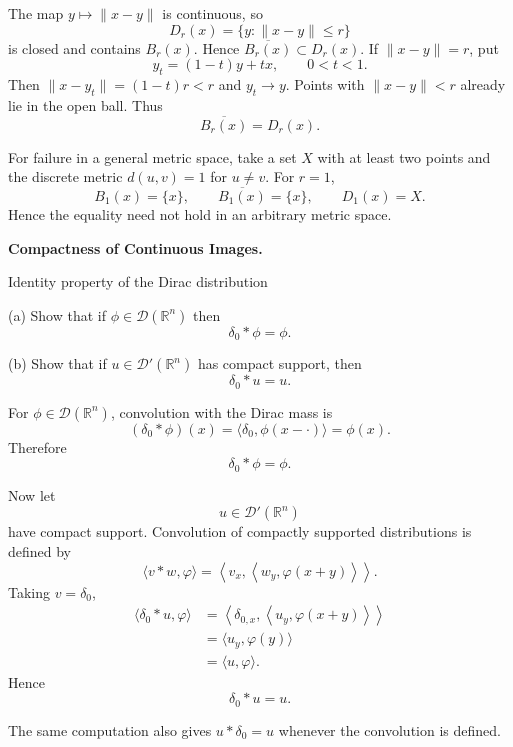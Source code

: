 \begin{solution}
The map \(y\mapsto\|x-y\|\) is continuous, so
\[
D_r(x)=\{y:\|x-y\|\le r\}
\]
is closed and contains \(B_r(x)\). Hence \(\overline{B_r(x)}\subset D_r(x)\).
If \(\|x-y\|=r\), put
\[
y_t=(1-t)y+tx,\qquad0<t<1.
\]
Then \(\|x-y_t\|=(1-t)r<r\) and \(y_t\to y\). Points with
\(\|x-y\|<r\) already lie in the open ball. Thus
\[
\boxed{\overline{B_r(x)}=D_r(x)}.
\]

For failure in a general metric space, take a set \(X\) with at least two points and
the discrete metric \(d(u,v)=1\) for \(u\ne v\). For \(r=1\),
\[
B_1(x)=\{x\},
\qquad
\overline{B_1(x)}=\{x\},
\qquad
D_1(x)=X.
\]
Hence the equality need not hold in an arbitrary metric space.
\end{solution}

\begin{problem}[CP-II-0166]
\label{prob:cp-ii-0166}
\textbf{Compactness of Continuous Images.}

\hspace*{1.5em}Identity property of the Dirac distribution

\noindent
(a)\; Show that if $\phi \in \mathcal{D}(\mathbb{R}^n)$ then
\[
\delta_0 * \phi = \phi .
\]

\medskip
\noindent
(b)\; Show that if $u \in \mathcal{D}'(\mathbb{R}^n)$ has compact support, then
\[
\delta_0 * u = u .
\]
\end{problem}

\begin{solution}
For \(\phi\in\mathcal D(\mathbb R^n)\), convolution with the Dirac mass is
\[
(\delta_0*\phi)(x)
=
\langle\delta_0,\phi(x-\cdot)\rangle
=
\phi(x).
\]
Therefore
\[
\boxed{\delta_0*\phi=\phi.}
\]

Now let
\[
u\in\mathcal D'(\mathbb R^n)
\]
have compact support. Convolution of compactly supported distributions is defined by
\[
\langle v*w,\varphi\rangle
=
\left\langle
v_x,
\left\langle
w_y,\varphi(x+y)
\right\rangle
\right\rangle.
\]
Taking \(v=\delta_0\),
\[
\begin{aligned}
\langle\delta_0*u,\varphi\rangle
&=
\left\langle
\delta_{0,x},
\left\langle
u_y,\varphi(x+y)
\right\rangle
\right\rangle\\
&=
\langle u_y,\varphi(y)\rangle\\
&=
\langle u,\varphi\rangle.
\end{aligned}
\]
Hence
\[
\boxed{\delta_0*u=u.}
\]

The same computation also gives \(u*\delta_0=u\) whenever the convolution is defined.
\end{solution}


